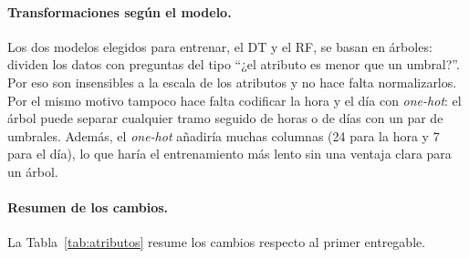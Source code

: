 \documentclass[12pt,a4paper]{article}
\begin{document}
\paragraph{Transformaciones según el modelo.} Los dos modelos elegidos para entrenar, el \ac{DT} y el \ac{RF}, se basan en árboles: dividen los datos con preguntas del tipo ``¿el atributo es menor que un umbral?''. Por eso son insensibles a la escala de los atributos y no hace falta normalizarlos. Por el mismo motivo tampoco hace falta codificar la hora y el día con
\textit{one-hot}: el árbol puede separar cualquier tramo seguido de horas o
de días con un par de umbrales. Además, el \textit{one-hot} añadiría muchas
columnas (24 para la hora y 7 para el día), lo que haría el entrenamiento más
lento sin una ventaja clara para un árbol.

\paragraph{Resumen de los cambios.} La Tabla~\ref{tab:atributos} resume los cambios respecto al primer entregable.
\end{document}
